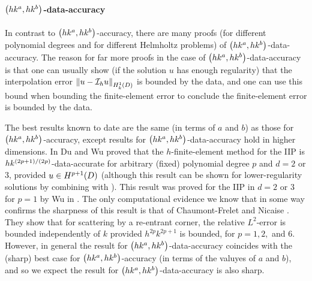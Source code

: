 \paragraph{$\hk{a}b$-data-accuracy} In contrast to $\hk{a}b$-accuracy, there are many proofs (for different polynomial degrees and for different Helmholtz problems) of $\hk{a}b$-data-accuracy. The reason for far more proofs in the case of $\hk{a}b$-data-accuracy is that one can usually show (if the solution $u$ has enough regularity) that the interpolation error $\NHokD{u -\Ih u}$ is bounded by the data, and one can use this bound when bounding the finite-element error to conclude the finite-element error is bounded by the data.

The best results known to date are the same (in terms of $a$ and $b$) as those for $\hk{a}b$-accuracy, except results for $\hk{a}b$-data-accuracy hold in higher dimensions. In \cite[Theorem 5.1, Corollary 5.2]{DuWu:15} Du and Wu proved that the $h$-finite-element method for the IIP is $hk^{(2p+1)/(2p)}$-data-accurate for arbitrary (fixed) polynomial degree $p$ and $d = 2$ or $3$, provided $u \in \HppoD$ (although this result can be shown for lower-regularity solutions by combining \cite[Theorem 5.1]{DuWu:15} with \cite[Lemma 3.5]{DuWu:15}). This result was proved for the IIP in $d = 2$ or $3$ for $p=1$ by Wu in \cite{Wu:14}. The only computational evidence we know that in some way  confirms the sharpness of this result is that of Chaumont-Frelet and Nicaise \cite[Section 6.3, Figure 9]{ChNi:18}. They show that for scattering by a re-entrant corner, the relative $L^2$-error is bounded independently of $k$ provided $h^{2p}k^{2p+1}$ is bounded, for $p = 1,2,$ and $6.$ However, in general the result for $\hk{a}b$-data-accuracy coincides with the (sharp) best case for $\hk{a}b$-accuracy (in terms of the valuyes of $a$ and $b$), and so we expect the result for $\hk{a}b$-data-accuracy is also sharp.

